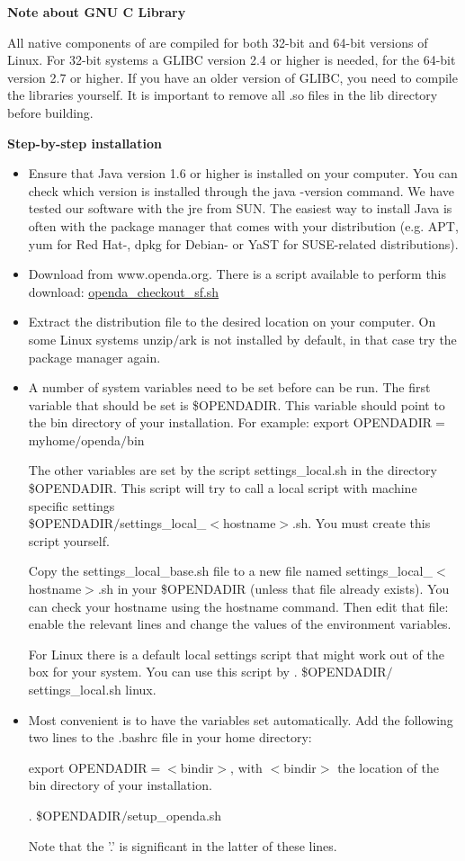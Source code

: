 \textbf{Note about GNU C Library}

All native components of \oda are compiled for both 32-bit and 64-bit versions of Linux. For 32-bit systems a GLIBC version 2.4 or higher is needed, for the 64-bit version 2.7 or higher. If you have an older version of GLIBC, you need to compile the libraries yourself. It is important to remove all .so files in the lib directory before building. 

\textbf{Step-by-step installation}

\begin{itemize}
\item
Ensure that Java version 1.6 or higher is installed on your computer. You can check which version is installed through the java -version command. We have tested our software with the jre from SUN. The easiest way to install Java is often with the package manager that comes with your distribution (e.g. APT, yum for Red Hat-, dpkg for Debian- or YaST for SUSE-related distributions).
\item
Download \oda from www.openda.org. There is a script available to perform this download: \href{http://www.openda.org/docu/openda_2.1/doc/usedoc/openda_checkout_sf.sh}{openda\_checkout\_sf.sh}
\item
Extract the \oda distribution file to the desired location on your computer. On some Linux systems unzip$/$ark is not installed by default, in that case try the package manager again.
\item
A number of system variables need to be set before \oda can be run. The first variable that should be set is 
\$OPENDADIR. This variable should point to the bin directory of your \oda installation. For example:
    export OPENDADIR$=$myhome$/$openda$/$bin
		
The other variables are set by the script settings\_local.sh in the directory \$OPENDADIR. This script will try to call a local script with machine specific settings \\
\$OPENDADIR$/$settings\_local\_$<$hostname$>$.sh. You must create this script yourself.

Copy the settings\_local\_base.sh file to a new file named settings\_local\_$<$hostname$>$.sh in your \$OPENDADIR (unless that file already exists). You can check your hostname using the hostname command. Then edit that file: enable the relevant lines and change the values of the environment variables.

For Linux there is a default local settings script that might work out of the box for your system. You can use this script by
    . \$OPENDADIR$/$settings\_local.sh linux.
\item
Most convenient is to have the variables set automatically. Add the following two lines to the .bashrc file in your home directory:

export OPENDADIR$=<$bindir$>$, with $<$bindir$>$ the location of the bin directory of your \oda installation.

. \$OPENDADIR$/$setup\_openda.sh

Note that the '.' is significant in the latter of these lines.
\end{itemize}


